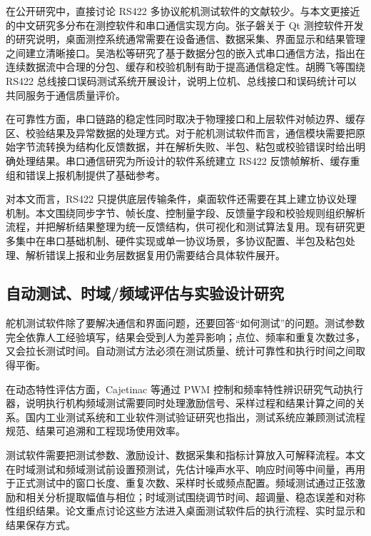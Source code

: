 在公开研究中，直接讨论 RS422 多协议舵机测试软件的文献较少。与本文更接近的中文研究多分布在测控软件和串口通信实现方向。张子磐关于 Qt 测控软件开发的研究说明，桌面测控系统通常需要在设备通信、数据采集、界面显示和结果管理之间建立清晰接口\cite{zhang2017qtflowmeter}。吴浩松等研究了基于数据分包的嵌入式串口通信方法，指出在连续数据流中合理的分包、缓存和校验机制有助于提高通信稳定性\cite{wu2025serialpacket}。胡腾飞等围绕 RS422 总线接口误码测试系统开展设计，说明上位机、总线接口和误码统计可以共同服务于通信质量评价\cite{hu2026rs422ber}。

在可靠性方面，串口链路的稳定性同时取决于物理接口和上层软件对帧边界、缓存区、校验结果及异常数据的处理方式。对于舵机测试软件而言，通信模块需要把原始字节流转换为结构化反馈数据，并在解析失败、半包、粘包或校验错误时给出明确处理结果。串口通信研究为所设计的软件系统建立 RS422 反馈帧解析、缓存重组和错误上报机制提供了基础参考。

对本文而言，RS422 只提供底层传输条件，桌面软件还需要在其上建立协议处理机制。本文围绕同步字节、帧长度、控制量字段、反馈量字段和校验规则组织解析流程，并把解析结果整理为统一反馈结构，供可视化和测试算法复用。现有研究更多集中在串口基础机制、硬件实现或单一协议场景，多协议配置、半包及粘包处理、解析错误上报和业务层数据复用仍需要结合具体软件展开。

\subsection{自动测试、时域/频域评估与实验设计研究}

舵机测试软件除了要解决通信和界面问题，还要回答“如何测试”的问题。测试参数完全依靠人工经验填写，结果会受到人为差异影响；点位、频率和重复次数过多，又会拉长测试时间。自动测试方法必须在测试质量、统计可靠性和执行时间之间取得平衡。

在动态特性评估方面，Cajetinac 等通过 PWM 控制和频率特性辨识研究气动执行器，说明执行机构频域测试需要同时处理激励信号、采样过程和结果计算之间的关系\cite{cajetinac2012pwm}。国内工业测试系统和工业软件测试验证研究也指出，测试系统应兼顾测试流程规范、结果可追溯和工程现场使用效率\cite{xu2021industry4test,liu2022industrialsoftware}。

测试软件需要把测试参数、激励设计、数据采集和指标计算放入可解释流程。本文在时域测试和频域测试前设置预测试，先估计噪声水平、响应时间等中间量，再用于正式测试中的窗口长度、重复次数、采样时长或频点配置。频域测试通过正弦激励和相关分析提取幅值与相位；时域测试围绕调节时间、超调量、稳态误差和对称性组织结果。论文重点讨论这些方法进入桌面测试软件后的执行流程、实时显示和结果保存方式。

